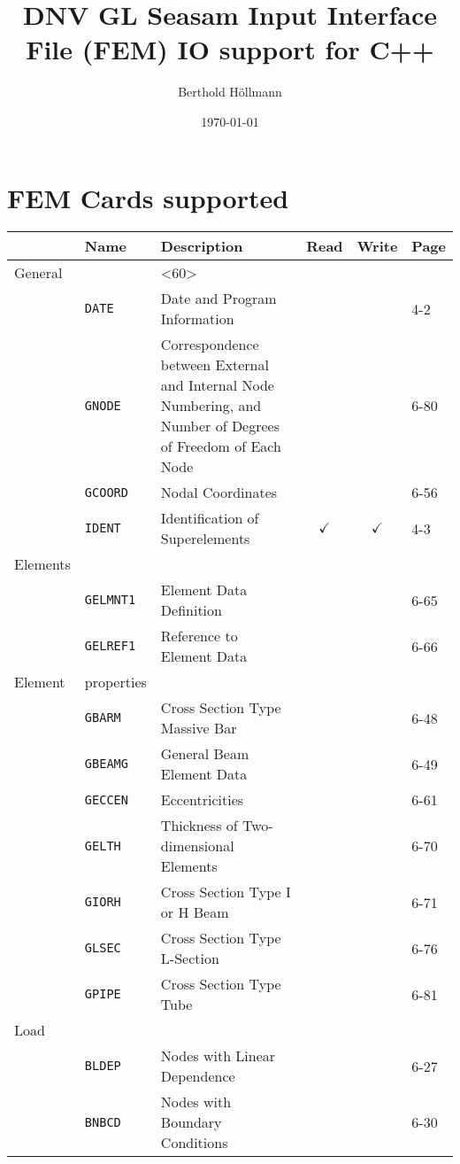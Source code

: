 \documentclass[paper=a4,%
twoside,%
10pt,%
headings=small,footinclude=false,%
headinclude,%
headlines,%
BCOR12mm,%
DIV14,%
colhead]{dnvglartcl}
\author{Berthold Höllmann}
\date{\today}
\title{DNV GL Seasam Input Interface File (FEM) IO support for C++}
\begin{document}
\maketitle

\section{FEM Cards supported}
\label{sec:orgheadline1}

\begin{center}
\begin{tabu} to 
 & \textbf{Name} & \textbf{Description} & \textbf{Read} & \textbf{Write} & \textbf{Page}\\
\hline
General &  & <60> &  &  & \\
 & \texttt{DATE} & Date and Program Information &  &  & 4-2\\
 & \texttt{GNODE} & Correspondence between External and Internal Node Numbering, and Number of Degrees of Freedom of Each Node &  &  & 6-80\\
 & \texttt{GCOORD} & Nodal Coordinates &  &  & 6-56\\
 & \texttt{IDENT} & Identification of Superelements & \(\checkmark\) & \(\checkmark\) & 4-3\\
Elements &  &  &  &  & \\
 & \texttt{GELMNT1} & Element Data Definition &  &  & 6-65\\
 & \texttt{GELREF1} & Reference to Element Data &  &  & 6-66\\
Element & properties &  &  &  & \\
 & \texttt{GBARM} & Cross Section Type Massive Bar &  &  & 6-48\\
 & \texttt{GBEAMG} & General Beam Element Data &  &  & 6-49\\
 & \texttt{GECCEN} & Eccentricities &  &  & 6-61\\
 & \texttt{GELTH} & Thickness of Two-dimensional Elements &  &  & 6-70\\
 & \texttt{GIORH} & Cross Section Type I or H Beam &  &  & 6-71\\
 & \texttt{GLSEC} & Cross Section Type L-Section &  &  & 6-76\\
 & \texttt{GPIPE} & Cross Section Type Tube &  &  & 6-81\\
Load &  &  &  &  & \\
 & \texttt{BLDEP} & Nodes with Linear Dependence &  &  & 6-27\\
 & \texttt{BNBCD} & Nodes with Boundary Conditions &  &  & 6-30\\

\end{tabu}
\end{center}
\end{document}
